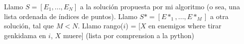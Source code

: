

Llamo $S = [E_1, ... ,E_N]$ a la solución propuesta por mi algoritmo (o sea, una lista ordenada de índices de puntos).
Llamo $S* = [E*_1, ... ,E*_M]$ a otra solución, tal que $M < N$.
Llamo rango($i$) = [$X$ en enemigos where tirar genkidama en $i$, $X$ muere] (lista por comprension a la python)




 




 



 



